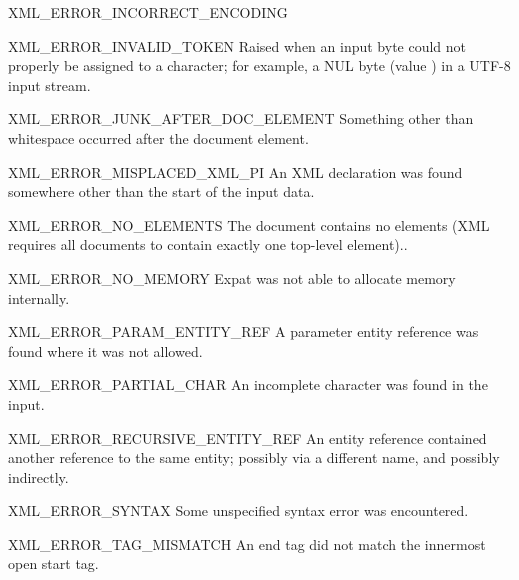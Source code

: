 \begin{datadescni}{XML_ERROR_INCORRECT_ENCODING}
\end{datadescni}

\begin{datadescni}{XML_ERROR_INVALID_TOKEN}
Raised when an input byte could not properly be assigned to a
character; for example, a NUL byte (value ) in a UTF-8 input
stream.
\end{datadescni}

\begin{datadescni}{XML_ERROR_JUNK_AFTER_DOC_ELEMENT}
Something other than whitespace occurred after the document element.
\end{datadescni}

\begin{datadescni}{XML_ERROR_MISPLACED_XML_PI}
An XML declaration was found somewhere other than the start of the
input data.
\end{datadescni}

\begin{datadescni}{XML_ERROR_NO_ELEMENTS}
The document contains no elements (XML requires all documents to
contain exactly one top-level element)..
\end{datadescni}

\begin{datadescni}{XML_ERROR_NO_MEMORY}
Expat was not able to allocate memory internally.
\end{datadescni}

\begin{datadescni}{XML_ERROR_PARAM_ENTITY_REF}
A parameter entity reference was found where it was not allowed.
\end{datadescni}

\begin{datadescni}{XML_ERROR_PARTIAL_CHAR}
An incomplete character was found in the input.
\end{datadescni}

\begin{datadescni}{XML_ERROR_RECURSIVE_ENTITY_REF}
An entity reference contained another reference to the same entity;
possibly via a different name, and possibly indirectly.
\end{datadescni}

\begin{datadescni}{XML_ERROR_SYNTAX}
Some unspecified syntax error was encountered.
\end{datadescni}

\begin{datadescni}{XML_ERROR_TAG_MISMATCH}
An end tag did not match the innermost open start tag.
\end{datadescni}

